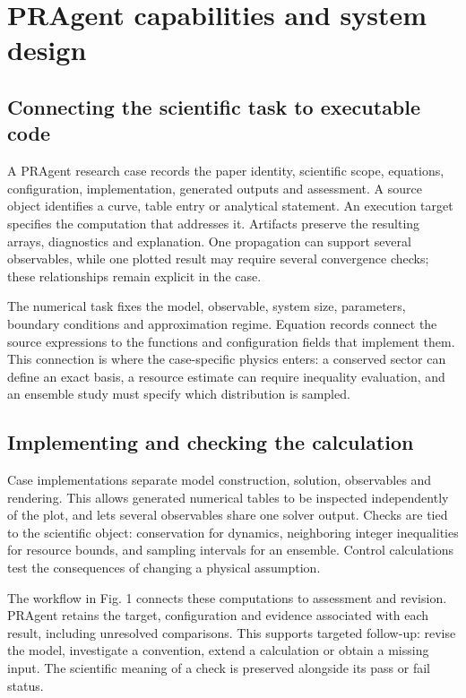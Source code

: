 \documentclass[10pt,a4paper]{article}
\begin{document}
\section{PRAgent capabilities and system
design}\label{pragent-capabilities-and-system-design}

\subsection{Connecting the scientific task to executable
code}\label{connecting-the-scientific-task-to-executable-code}

A PRAgent research case records the paper identity, scientific scope,
equations, configuration, implementation, generated outputs and
assessment. A source object identifies a curve, table entry or
analytical statement. An execution target specifies the computation that
addresses it. Artifacts preserve the resulting arrays, diagnostics and
explanation. One propagation can support several observables, while one
plotted result may require several convergence checks; these
relationships remain explicit in the case.

The numerical task fixes the model, observable, system size, parameters,
boundary conditions and approximation regime. Equation records connect
the source expressions to the functions and configuration fields that
implement them. This connection is where the case-specific physics
enters: a conserved sector can define an exact basis, a resource
estimate can require inequality evaluation, and an ensemble study must
specify which distribution is sampled.

\subsection{Implementing and checking the
calculation}\label{implementing-and-checking-the-calculation}

Case implementations separate model construction, solution, observables
and rendering. This allows generated numerical tables to be inspected
independently of the plot, and lets several observables share one solver
output. Checks are tied to the scientific object: conservation for
dynamics, neighboring integer inequalities for resource bounds, and
sampling intervals for an ensemble. Control calculations test the
consequences of changing a physical assumption.

The workflow in Fig. 1 connects these computations to assessment and
revision. PRAgent retains the target, configuration and evidence
associated with each result, including unresolved comparisons. This
supports targeted follow-up: revise the model, investigate a convention,
extend a calculation or obtain a missing input. The scientific meaning
of a check is preserved alongside its pass or fail status.
\end{document}
